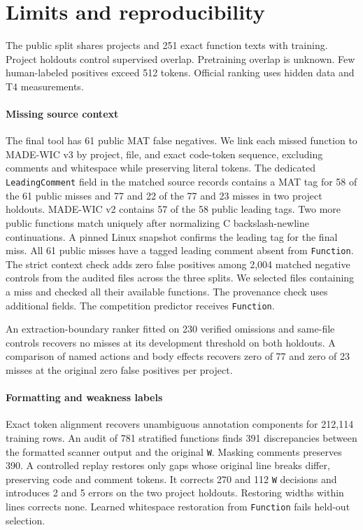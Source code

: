 \documentclass[10pt,conference]{IEEEtran}
\begin{document}
\section{Limits and reproducibility}
The public split shares projects and 251 exact function texts with training.
Project holdouts control supervised overlap. Pretraining overlap is unknown.
Few human-labeled positives exceed 512 tokens. Official ranking uses hidden
data and T4 measurements.

\paragraph{Missing source context}
The final tool has 61 public MAT false negatives. We link each missed function
to MADE-WIC v3 \cite{madewicv3} by project, file, and exact code-token sequence,
excluding comments and whitespace while preserving literal tokens. The dedicated
\texttt{LeadingComment} field in the matched source records contains a MAT tag
for 58 of the 61 public misses and 77 and 22 of the 77 and 23 misses in
two project holdouts. MADE-WIC v2 contains 57 of the 58 public leading tags.
Two more public functions match uniquely after normalizing C backslash-newline
continuations. A pinned Linux snapshot confirms the leading tag for the final
miss. All 61 public misses have a tagged leading comment absent from
\texttt{Function}. The strict context check adds zero false positives among
2,004 matched negative controls from the audited files across the three splits.
We selected files containing a miss and checked all their available functions.
The provenance check uses additional fields. The competition predictor receives
\texttt{Function}.

An extraction-boundary ranker fitted on 230 verified omissions and same-file
controls recovers no misses at its development threshold on both holdouts.
A comparison of named actions and body effects recovers zero of 77 and
zero of 23 misses at the original zero false positives per project.

\paragraph{Formatting and weakness labels}
Exact token alignment recovers unambiguous annotation components for 212,114
training rows. An audit of 781 stratified functions finds 391 discrepancies
between the formatted scanner output and the original \texttt{W}. Masking
comments preserves 390. A controlled replay restores only gaps whose original
line breaks differ, preserving code and comment tokens. It corrects 270 and
112 \texttt{W} decisions and introduces 2 and 5 errors on the two project
holdouts. Restoring widths within lines corrects none. Learned whitespace
restoration from \texttt{Function} fails held-out selection.
\end{document}
